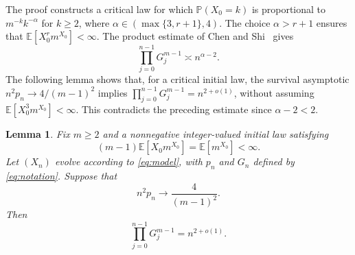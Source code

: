 \documentclass[11pt,letterpaper,reqno]{amsart}
\numberwithin{equation}{section}
\theoremstyle{plain}
\newtheorem{lemma}[theorem]{Lemma}
\theoremstyle{remark}
\newcommand{\E}{\mathbb E}\newcommand{\Pp}{\mathbb P}
\begin{document}
The proof constructs a critical law for which $\Pp(X_0=k)$ is proportional to $m^{-k}k^{-\alpha}$ for $k\ge2$, where $\alpha\in(\max\{3,r+1\},4)$. The choice $\alpha>r+1$ ensures that $\E[X_0^rm^{X_0}]<\infty$. The product estimate of Chen and Shi~\cite[Theorem~1.1]{CS} gives
\[
 \prod_{j=0}^{n-1}G_j^{m-1}\asymp n^{\alpha-2}.
\]
The following lemma shows that, for a critical initial law, the survival asymptotic $n^2p_n\to4/(m-1)^2$ implies $\prod_{j=0}^{n-1}G_j^{m-1}=n^{2+o(1)}$, without assuming $\E[X_0^3m^{X_0}]<\infty$. This contradicts the preceding estimate since $\alpha-2<2$.

\begin{lemma}\label{lem:productasymptotic}
Fix $m\ge2$ and a nonnegative integer-valued initial law satisfying
\[
 (m-1)\E[X_0m^{X_0}]=\E[m^{X_0}]<\infty.
\]
Let $(X_n)$ evolve according to \eqref{eq:model}, with $p_n$ and $G_n$
defined by \eqref{eq:notation}.
Suppose that
\begin{equation}\label{eq:survivalassumption}
 n^2p_n\longrightarrow\frac4{(m-1)^2}.
\end{equation}
Then
\begin{equation}\label{eq:productasymptotic}
 \prod_{j=0}^{n-1}G_j^{m-1}=n^{2+o(1)}.
\end{equation}
\end{lemma}
\end{document}
